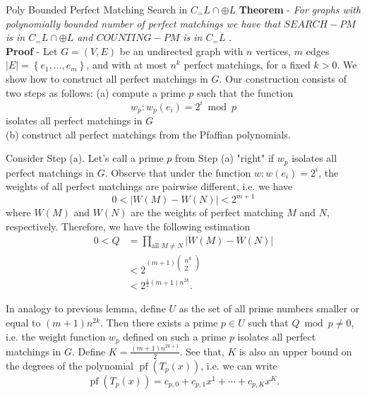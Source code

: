\documentclass{beamer}
\begin{document}
\begin{frame}[allowframebreaks]{Poly Bounded Perfect Matching Search in $C_=L \cap \oplus L$}
	\textbf{Theorem} - \textit{For graphs with polynomially bounded number of perfect matchings we have that  $SEARCH-PM$ is in $C_=L \cap \oplus L$ and $COUNTING-PM$ is in $C_=L$} .\\
	\textbf{Proof} - Let $G=(V, E)$ be an undirected graph with $n$ vertices, $m$ edges $|E|=\left\{e_1, \ldots, e_m\right\}$, and with at most $n^k$ perfect matchings, for a fixed $k>0$. We show how to construct all perfect matchings in $G$. Our construction consists of two steps as follows:
	(a) compute a prime $p$ such that the function
	$$
	w_p: w_p\left(e_i\right)=2^i \bmod p
	$$
	isolates all perfect matchings in $G$\\
	(b) construct all perfect matchings from the Pfaffian polynomials.
	
	Consider Step (a). Let's call a prime $p$ from Step (a) "right" if $w_p$ isolates all perfect matchings in $G$. Observe that under the function $w: w\left(e_i\right)=2^i$, the weights of all perfect matchings are pairwise different, i.e. we have
	$$
	0<|W(M)-W(N)|<2^{m+1}
	$$
	where $W(M)$ and $W(N)$ are the weights of perfect matching $M$ and $N$, respectively. Therefore, we have the following estimation
	$$
	\begin{aligned}
		0<Q & =\prod_{\text {all } M \neq N}|W(M)-W(N)| \\
		& <2^{(m+1)\left(\begin{array}{c}
				n^k \\
				2
			\end{array}\right)} \\
		& <2^{\frac{1}{2}(m+1) n^{2 k}} .
	\end{aligned}
	$$
	
	In analogy to previous lemma, define $U$ as the set of all prime numbers smaller or equal to $(m+1) n^{2 k}$. Then there exists a prime $p \in U$ such that $Q \bmod p \neq 0$, i.e. the weight function $w_p$ defined on such a prime $p$ isolates all perfect matchings in $G$. Define $K=\frac{(m+ 1) n^{2 k+1}}{2}$. See that, $K$ is also an upper bound on the degrees of the polynomial $\operatorname{pf}\left(T_p(x)\right)$, i.e. we can write
	$$
	\operatorname{pf}\left(T_p(x)\right)=c_{p, 0}+c_{p, 1} x^1+\cdots+c_{p, K} x^K .
	$$
	

\end{frame}
\end{document}

